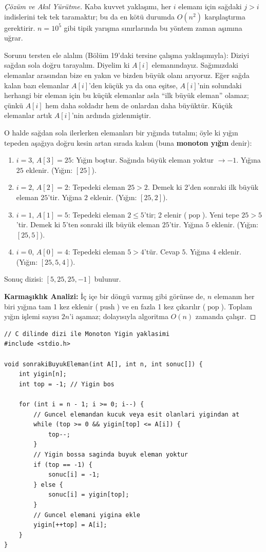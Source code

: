 \begin{proof}[Çözüm ve Akıl Yürütme]
Kaba kuvvet yaklaşımı, her $i$ elemanı için sağdaki $j > i$ indislerini tek tek taramaktır; bu da en kötü durumda $O(n^2)$ karşılaştırma gerektirir. $n = 10^5$ gibi tipik yarışma sınırlarında bu yöntem zaman aşımına uğrar.

Sorunu tersten ele alalım (Bölüm 19'daki tersine çalışma yaklaşımıyla): Diziyi sağdan sola doğru tarayalım. Diyelim ki $A[i]$ elemanındayız. Sağımızdaki elemanlar arasından bize en yakın ve bizden büyük olanı arıyoruz. Eğer sağda kalan bazı elemanlar $A[i]$'den küçük ya da ona eşitse, $A[i]$'nin solundaki herhangi bir eleman için bu küçük elemanlar asla ``ilk büyük eleman'' olamaz; çünkü $A[i]$ hem daha soldadır hem de onlardan daha büyüktür. Küçük elemanlar artık $A[i]$'nin ardında gizlenmiştir.

O halde sağdan sola ilerlerken elemanları bir yığında tutalım; öyle ki yığın tepeden aşağıya doğru kesin artan sırada kalsın (buna \textbf{monoton yığın} denir):
\begin{enumerate}
    \item $i = 3$, $A[3] = 25$: Yığın boştur. Sağında büyük eleman yoktur $\to -1$. Yığına $25$ eklenir. (Yığın: $[25]$).
    \item $i = 2$, $A[2] = 2$: Tepedeki eleman $25 > 2$. Demek ki 2'den sonraki ilk büyük eleman $25$'tir. Yığına $2$ eklenir. (Yığın: $[25, 2]$).
    \item $i = 1$, $A[1] = 5$: Tepedeki eleman $2 \le 5$'tir; 2 elenir ($\operatorname{pop}$). Yeni tepe $25 > 5$'tir. Demek ki 5'ten sonraki ilk büyük eleman $25$'tir. Yığına $5$ eklenir. (Yığın: $[25, 5]$).
    \item $i = 0$, $A[0] = 4$: Tepedeki eleman $5 > 4$'tür. Cevap $5$. Yığına $4$ eklenir. (Yığın: $[25, 5, 4]$).
\end{enumerate}

Sonuç dizisi: $[5, 25, 25, -1]$ bulunur.

\textbf{Karmaşıklık Analizi:} İç içe bir döngü varmış gibi görünse de, $n$ elemanın her biri yığına tam 1 kez eklenir ($\operatorname{push}$) ve en fazla 1 kez çıkarılır ($\operatorname{pop}$). Toplam yığın işlemi sayısı $2n$'i aşamaz; dolayısıyla algoritma $O(n)$ zamanda çalışır.
\end{proof}

\begin{lstlisting}[language=CTemel]
// C dilinde dizi ile Monoton Yigin yaklasimi
#include <stdio.h>

void sonrakiBuyukEleman(int A[], int n, int sonuc[]) {
    int yigin[n];
    int top = -1; // Yigin bos

    for (int i = n - 1; i >= 0; i--) {
        // Guncel elemandan kucuk veya esit olanlari yigindan at
        while (top >= 0 && yigin[top] <= A[i]) {
            top--;
        }
        // Yigin bossa saginda buyuk eleman yoktur
        if (top == -1) {
            sonuc[i] = -1;
        } else {
            sonuc[i] = yigin[top];
        }
        // Guncel elemani yigina ekle
        yigin[++top] = A[i];
    }
}
\end{lstlisting}

